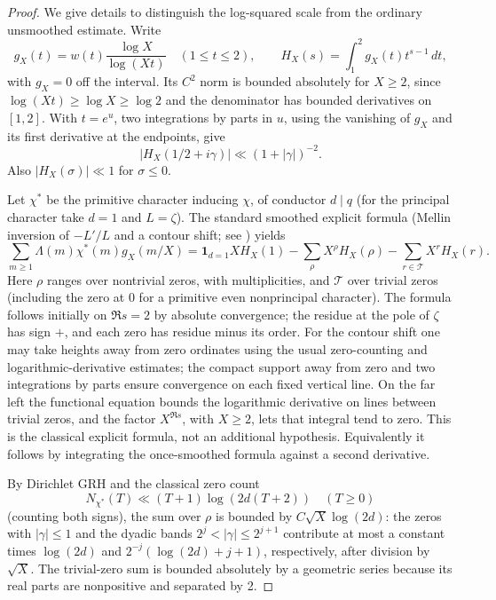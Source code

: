 \documentclass[11pt]{article}
\theoremstyle{remark}\newtheorem{remark}[theorem]{Remark}
\begin{document}
\begin{proof}
We give details to distinguish the log-squared scale from the ordinary unsmoothed estimate. Write
\[
 g_X(t)=w(t)\frac{\log X}{\log(Xt)}\quad(1\le t\le2),\qquad
 H_X(s)=\int_1^2 g_X(t)t^{s-1}\,dt,
\]
with $g_X=0$ off the interval. Its $C^2$ norm is bounded absolutely for $X\ge2$, since $\log(Xt)\ge\log X\ge\log 2$ and the denominator has bounded derivatives on $[1,2]$. With $t=e^u$, two integrations by parts in $u$, using the vanishing of $g_X$ and its first derivative at the endpoints, give
\begin{equation}\label{eq:mellin}
 |H_X(1/2+i\gamma)|\ll (1+|\gamma|)^{-2}.
\end{equation}
Also $|H_X(\sigma)|\ll1$ for $\sigma\le0$.

Let $\chi^*$ be the primitive character inducing $\chi$, of conductor $d\mid q$ (for the principal character take $d=1$ and $L=\zeta$). The standard smoothed explicit formula (Mellin inversion of $-L'/L$ and a contour shift; see \cite[Chs.~12--13]{mv}) yields
\begin{equation}\label{eq:exp-formula}
 \sum_{m\ge1}\Lambda(m)\chi^*(m)g_X(m/X)
 =\mathbf1_{d=1}XH_X(1)-\sum_{\rho}X^\rho H_X(\rho)
 -\sum_{r\in\mathcal T}X^r H_X(r).
\end{equation}
Here $\rho$ ranges over nontrivial zeros, with multiplicities, and $\mathcal T$ over trivial zeros (including the zero at $0$ for a primitive even nonprincipal character). The formula follows initially on $\Re s=2$ by absolute convergence; the residue at the pole of $\zeta$ has sign $+$, and each zero has residue minus its order. For the contour shift one may take heights away from zero ordinates using the usual zero-counting and logarithmic-derivative estimates; the compact support away from zero and two integrations by parts ensure convergence on each fixed vertical line. On the far left the functional equation bounds the logarithmic derivative on lines between trivial zeros, and the factor $X^{\Re s}$, with $X\ge2$, lets that integral tend to zero. This is the classical explicit formula, not an additional hypothesis. Equivalently it follows by integrating the once-smoothed formula against a second derivative.

By Dirichlet GRH and the classical zero count
\[
 N_{\chi^*}(T)\ll (T+1)\log(2d(T+2))\quad(T\ge0)
\]
(counting both signs), the sum over $\rho$ is bounded by $C\sqrt X\log(2d)$: the zeros with $|\gamma|\le1$ and the dyadic bands $2^j<|\gamma|\le2^{j+1}$ contribute at most a constant times $\log(2d)$ and $2^{-j}(\log(2d)+j+1)$, respectively, after division by $\sqrt X$. The trivial-zero sum is bounded absolutely by a geometric series because its real parts are nonpositive and separated by 2.


\end{proof}
\end{document}
